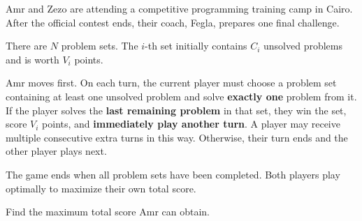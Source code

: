Amr and Zezo are attending a competitive programming training camp in Cairo. After the official contest ends, their coach, Fegla, prepares one final challenge.

There are $N$ problem sets. The $i$-th set initially contains $C_i$ unsolved problems and is worth $V_i$ points.

Amr moves first. On each turn, the current player must choose a problem set containing at least one unsolved problem and solve \textbf{exactly one} problem from it. If the player solves the \textbf{last remaining problem} in that set, they win the set, score $V_i$ points, and \textbf{immediately play another turn}. A player may receive multiple consecutive extra turns in this way. Otherwise, their turn ends and the other player plays next.

The game ends when all problem sets have been completed. Both players play optimally to maximize their own total score.

Find the maximum total score Amr can obtain.
